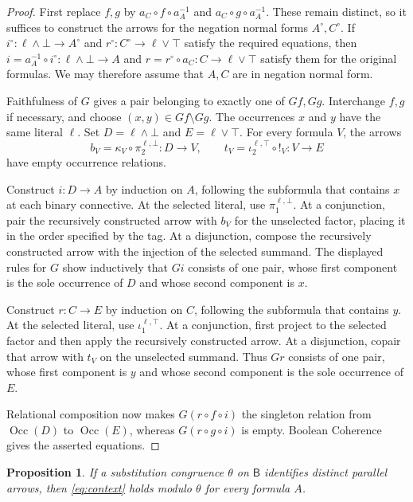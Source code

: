 \documentclass[11pt]{article}
\newtheorem{proposition}[theorem]{Proposition}
\newcommand{\B}{\mathsf B}
\newcommand{\Occ}{\operatorname{Occ}}
\begin{document}
\begin{proof}
First replace $f,g$ by $a_C\circ f\circ a_A^{-1}$ and
$a_C\circ g\circ a_A^{-1}$. These remain distinct, so it suffices to
construct the arrows for the negation normal forms $A^\circ,C^\circ$.
If
$i^\circ:\ell\wedge\bot\to A^\circ$ and
$r^\circ:C^\circ\to\ell\vee\top$ satisfy the required equations,
then $i=a_A^{-1}\circ i^\circ:\ell\wedge\bot\to A$ and
$r=r^\circ\circ a_C:C\to\ell\vee\top$ satisfy them for the original
formulas.
We may therefore assume that $A,C$ are in negation normal form.

Faithfulness of $G$ gives a pair belonging to exactly one of $Gf,Gg$.
Interchange $f,g$ if necessary, and choose
$(x,y)\in Gf\setminus Gg$. The occurrences $x$ and $y$ have the same
literal $\ell$. Set $D=\ell\wedge\bot$ and $E=\ell\vee\top$.
For every formula $V$, the arrows
\[
 b_V=\kappa_V\circ\pi_2^{\ell,\bot}:D\to V,
 \qquad
 t_V=\iota_2^{\ell,\top}\circ!_V:V\to E
\]
have empty occurrence relations.

Construct $i:D\to A$ by induction on $A$, following the subformula
that contains $x$ at each binary connective. At the selected literal, use $\pi_1^{\ell,\bot}$.
At a conjunction, pair the recursively constructed arrow with $b_V$
for the unselected factor, placing it in the order specified by the
tag. At a disjunction, compose the recursively constructed arrow
with the injection of the selected summand. The displayed rules for
$G$ show inductively that $Gi$ consists of one pair, whose first component
is the sole occurrence of $D$ and whose second component is $x$.

Construct $r:C\to E$ by induction on $C$, following the subformula
that contains $y$.
At the selected literal, use $\iota_1^{\ell,\top}$.
At a conjunction, first project to the selected factor and then apply
the recursively constructed arrow. At a disjunction, copair that
arrow with $t_V$ on the unselected summand. Thus $Gr$ consists of one pair,
whose first component is $y$ and whose second component is the sole
occurrence of $E$.

Relational composition now makes $G(r\circ f\circ i)$ the singleton
relation from $\Occ(D)$ to $\Occ(E)$, whereas
$G(r\circ g\circ i)$ is empty. Boolean Coherence gives the asserted
equations.
\end{proof}

\begin{proposition}\label{prop:all-contexts}
If a substitution congruence $\theta$ on $\B$ identifies distinct
parallel arrows, then \eqref{eq:context} holds modulo $\theta$ for
every formula $A$.
\end{proposition}
\end{document}
